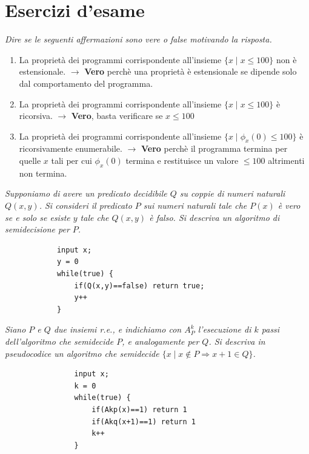 \documentclass[12pt, a4paper]{report}
\begin{document}
        \chapter{Esercizi d'esame}
        \begin{exercise}
            \textit{Dire se le seguenti affermazioni sono vere o false motivando la risposta.}
            \begin{enumerate}
                \item La proprietà dei programmi corrispondente all'insieme $\{x\mid x\leq 100\}$ non è estensionale. $\rightarrow$ \textbf{Vero} perchè una proprietà è estensionale se dipende solo dal comportamento del programma.
                \item La proprietà dei programmi corrispondente all'insieme $\{x\mid x\leq 100\}$ è ricorsiva. $\rightarrow$ \textbf{Vero}, basta verificare se $x\leq 100$
                \item La proprietà dei programmi corrispondente all'insieme $\{x\mid\phi_x(0)\leq 100\}$ è ricorsivamente enumerabile. $\rightarrow$ \textbf{Vero} perchè il programma termina per quelle $x$ tali per cui $\phi_x(0)$ termina e restituisce un valore $\leq 100$ altrimenti non termina.
            \end{enumerate}
        \end{exercise}
        \begin{exercise}
        \textit{Supponiamo di avere un predicato decidibile $Q$ su coppie di numeri naturali $Q(x,y)$. Si consideri il predicato $P$ sui numeri naturali tale che $P(x)$ è vero se e solo se esiste $y$ tale che $Q(x,y)$ è falso. Si descriva un algoritmo di semidecisione per $P$.}
        \begin{verbatim}
            input x;
            y = 0
            while(true) {
                if(Q(x,y)==false) return true;
                y++
            }
        \end{verbatim}
        \end{exercise}
        \begin{exercise}
            \textit{Siano $P$ e $Q$ due insiemi r.e., e indichiamo con $A^k_P$ l'esecuzione di $k$ passi dell'algoritmo che semidecide $P$, e analogamente per $Q$. Si descriva in pseudocodice un algoritmo che semidecide $\{x\mid x\notin P\Rightarrow x+1 \in Q\}$.}
            \begin{verbatim}
                input x;
                k = 0
                while(true) {
                    if(Akp(x)==1) return 1
                    if(Akq(x+1)==1) return 1
                    k++
                }
            \end{verbatim}
        \end{exercise}
\end{document}
